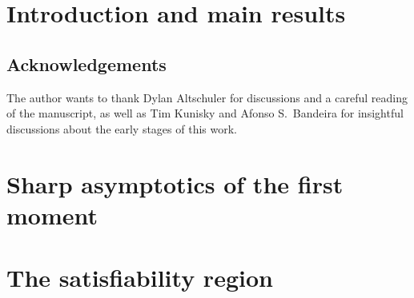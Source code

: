 \documentclass[a4paper,11pt]{article}
\begin{document}
\section{Introduction and main results}\label{sec:intro}


\subsection*{Acknowledgements}
The author wants to thank Dylan Altschuler for discussions and a careful reading of the manuscript, 
as well as
Tim Kunisky and Afonso S.\ Bandeira for insightful discussions about the early stages of this work.

\section{Sharp asymptotics of the first moment}\label{sec:1st_moment}


\section{The satisfiability region}\label{sec:2nd_moment}


\printbibliography
\end{document}
